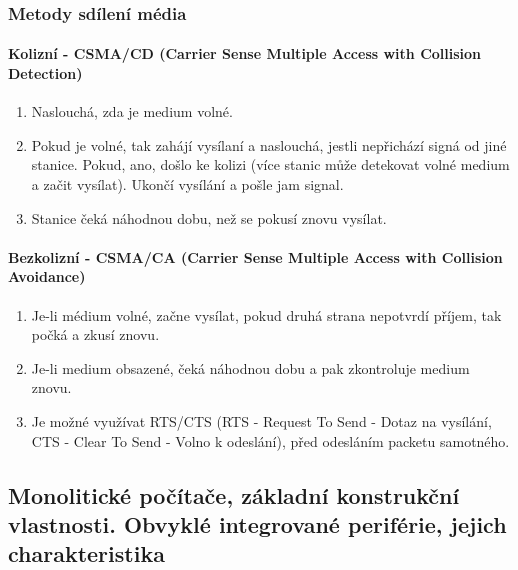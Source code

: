 \documentclass[10pt,a4paper]{article}
\begin{document}
\subsubsection{ Metody sdílení média}
\paragraph{Kolizní - CSMA/CD (Carrier Sense Multiple Access with Collision Detection)} 
\begin{enumerate}
\item Naslouchá, zda je medium volné.
\item Pokud je volné, tak zahájí vysílaní a naslouchá, jestli nepřichází signá od jiné stanice. Pokud, ano, došlo ke kolizi (více stanic může detekovat volné medium a začit vysílat). Ukončí vysílání a pošle jam signal.
\item Stanice čeká náhodnou dobu, než se pokusí znovu vysílat.
\end{enumerate}
\paragraph{Bezkolizní - CSMA/CA (Carrier Sense Multiple Access with Collision Avoidance)}
\begin{enumerate}
\item Je-li médium volné, začne vysílat, pokud druhá strana nepotvrdí příjem, tak počká a zkusí znovu.
\item Je-li medium obsazené, čeká náhodnou dobu a pak zkontroluje medium znovu.
\item Je možné využívat RTS/CTS (RTS - Request To Send - Dotaz na vysílání, CTS - Clear To Send - Volno k odeslání), před odesláním packetu samotného.
\end{enumerate}

\subsection{Monolitické počítače, základní konstrukční vlastnosti. Obvyklé integrované periférie, jejich charakteristika}
\end{document}
